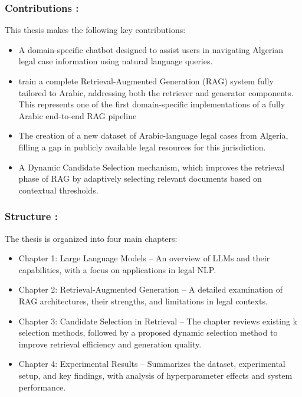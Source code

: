 \subsubsection*{Contributions :} This thesis makes the following key contributions:
\begin{itemize}
	\item A domain-specific chatbot designed to assist users in navigating Algerian legal case information using natural language queries.
    \item train a complete Retrieval-Augmented Generation (RAG) system fully tailored to Arabic, addressing both the retriever and generator components. This represents one of the first domain-specific implementations of a fully Arabic end-to-end RAG pipeline
	\item The creation of a new dataset of Arabic-language  legal cases from Algeria, filling a gap in publicly available legal resources for this jurisdiction.
	\item A Dynamic Candidate Selection mechanism, which improves the retrieval phase of RAG by adaptively selecting relevant documents based on contextual thresholds.
\end{itemize}
\subsubsection*{Structure :} 
The thesis is organized into four main chapters: 
\begin{itemize}
	\item Chapter 1: Large Language Models – An overview of LLMs and their capabilities, with a focus on applications in legal NLP.
	
	\item Chapter 2: Retrieval-Augmented Generation – A detailed examination of RAG architectures, their strengths, and limitations in legal contexts.

	\item Chapter 3: Candidate Selection in Retrieval – The chapter reviews existing k selection methods, followed by a proposed dynamic selection method to improve retrieval efficiency and generation quality.

	\item Chapter 4: Experimental Results – Summarizes the dataset, experimental setup, and key findings, with analysis of hyperparameter effects and system performance.
\end{itemize}
